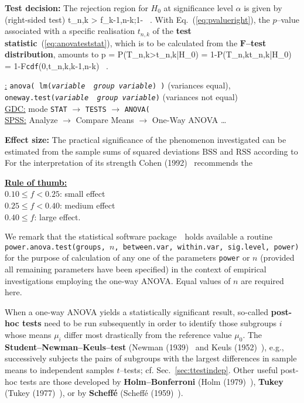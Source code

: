 \medskip
\noindent
\textbf{Test decision:} The rejection region for $H_{0}$ at 
significance level $\alpha$ is given by (right-sided test)
%
\be
t_{n,k} > f_{k-1,n-k;1-\alpha} \ .
\ee
%
With Eq.~(\ref{eq:pvalueright}), the $p$--value associated with a 
specific realisation $t_{n,k}$ of the \textbf{test
statistic}~(\ref{eq:anovateststat}), which
is to be calculated from the $\boldsymbol{F}$\textbf{--test
distribution}, amounts to
%
\be
p = P(T_{n,k}>t_{n,k}|H_{0}) = 1-P(T_{n,k}\leq t_{n,k}|H_{0})
= 1-F\texttt{cdf}(0,t_{n,k},k-1,n-k) \ .
\ee
%

\medskip
\noindent
\underline{\R:}
\texttt{anova( lm(\textit{variable}~\texttildelow~\textit{group
variable}) )} (variances equal), \\
\texttt{oneway.test(\textit{variable}~\texttildelow~\textit{group
variable})} (variances not equal) \\
\underline{GDC:} mode \texttt{STAT} $\rightarrow$ \texttt{TESTS}
$\rightarrow$ \texttt{ANOVA(} \\
\underline{SPSS:} Analyze $\rightarrow$ Compare Means
$\rightarrow$ One-Way ANOVA \ldots

\medskip
\noindent
\textbf{Effect size:} The practical significance of the phenomenon investigated can be estimated from the sample sums of squared 
deviations $\text{BSS}$ and $\text{RSS}$ according to
%
\be
{}
\ee
%
For the interpretation of its strength Cohen 
(1992)~ recommends the

\medskip
\noindent
\underline{\textbf{Rule of thumb:}}\\
$0.10 \leq f < 0.25$: small effect\\
$0.25 \leq f < 0.40$: medium effect\\
$0.40 \leq f$: large effect.

\medskip
\noindent
We remark that the statistical software package~\R\ holds 
available a routine \texttt{power.anova.test(groups, $n$, 
between.var, within.var, sig.level, power)} for the purpose of 
calculation of any one of the parameters \texttt{power} or $n$
(provided all remaining parameters have been specified) in the 
context of empirical investigations employing the one-way ANOVA. 
Equal values of $n$ are required here.

\medskip
\noindent
When a one-way ANOVA yields a statistically significant result, 
so-called \textbf{post-hoc tests} need to be run subsequently in 
order to identify those subgroups $i$ whose means $\mu_{i}$ differ 
most drastically from the reference value $\mu_{0}$. The
\textbf{Student--Newman--Keuls--test} (Newman (1939)~
and Keuls (1952)~), e.g., successively subjects the
pairs of subgroups with the largest differences in sample means to 
independent samples $t$--tests; cf. Sec.~\ref{sec:ttestindep}. 
Other useful post-hoc tests are those developed by \textbf{
Holm--Bonferroni} (Holm (1979)~), \textbf{Tukey} (Tukey 
(1977)~), or by \textbf{Schef\-f\'{e}} (Schef\-f\'{e} 
(1959)~).

